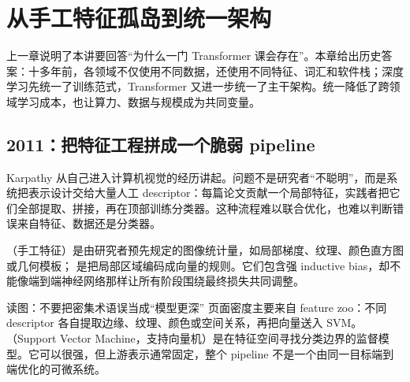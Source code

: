 \section{从手工特征孤岛到统一架构}

上一章说明了本讲要回答“为什么一门 Transformer 课会存在”。本章给出历史答案：十多年前，各领域不仅使用不同数据，还使用不同特征、词汇和软件栈；深度学习先统一了训练范式，Transformer 又进一步统一了主干架构。统一降低了跨领域学习成本，也让算力、数据与规模成为共同变量。

\subsection{2011：把特征工程拼成一个脆弱 pipeline}

Karpathy 从自己进入计算机视觉的经历讲起。问题不是研究者“不聪明”，而是系统把表示设计交给大量人工 descriptor：每篇论文贡献一个局部特征，实践者把它们全部提取、拼接，再在顶部训练分类器。这种流程难以联合优化，也难以判断错误来自特征、数据还是分类器。




（手工特征）是由研究者预先规定的图像统计量，如局部梯度、纹理、颜色直方图或几何模板； 是把局部区域编码成向量的规则。它们包含强 inductive bias，却不能像端到端神经网络那样让所有阶段围绕最终损失共同调整。


\begin{knowledgebox}{读图：不要把密集术语误当成“模型更深”}
页面密度主要来自 feature zoo：不同 descriptor 各自提取边缘、纹理、颜色或空间关系，再把向量送入 SVM。（Support Vector Machine，支持向量机）是在特征空间寻找分类边界的监督模型。它可以很强，但上游表示通常固定，整个 pipeline 不是一个由同一目标端到端优化的可微系统。
\end{knowledgebox}

